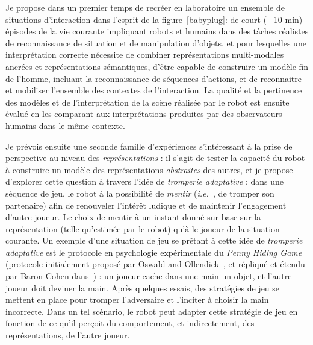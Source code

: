 \documentclass[a4paper]{article}
\newcommand{\ie}{{\textit{i.e.~}}}
\begin{document}
Je propose dans un premier temps de recréer en laboratoire un ensemble de
situations d'interaction dans l'esprit de la figure~\ref{babyplug}: de court
(~ 10 min) épisodes
de la vie courante impliquant robots et humains dans des tâches réalistes de
reconnaissance de situation et de manipulation d'objets, et pour lesquelles une
interprétation correcte nécessite de combiner représentations multi-modales
ancrées et représentations sémantiques, d'être capable de construire un modèle
fin de l'homme, incluant la reconnaissance de séquences d'actions, et de
reconnaitre et mobiliser l'ensemble des contextes de l'interaction. La qualité
et la pertinence des modèles et de l'interprétation de la scène réalisée par le
robot est ensuite évalué en les comparant aux interprétations produites par des
observateurs humains dans le même contexte.

Je prévois ensuite une seconde famille d'expériences s'intéressant à la prise de
perspective au niveau des \emph{représentations} : il s'agit de tester la
capacité du robot à construire un modèle des représentations \emph{abstraites}
des autres, et je propose d'explorer cette question à travers l'idée de
\emph{tromperie adaptative} : dans une séquence de jeu, le robot à la
possibilité de \emph{mentir} (\ie, de tromper son partenaire) afin de renouveler
l'intérêt ludique et de maintenir l'engagement d'autre joueur. Le choix de
mentir à un instant donné sur base sur la représentation (telle qu'estimée par
le robot) qu'à le joueur de la situation courante. Un exemple d'une situation
de jeu se prêtant à cette idée de \emph{tromperie adaptative} est le protocole
en psychologie expérimentale du \emph{Penny Hiding Game} (protocole initialement
proposé par Oswald and Ollendick~\cite{oswald1989role}, et répliqué et étendu
par Baron-Cohen dans~\cite{baron1992out}) : un joueur cache dans une main un
objet, et l'autre joueur doit deviner la main. Après quelques essais, des
stratégies de jeu se mettent en place pour tromper l'adversaire et l'inciter à
choisir la main incorrecte. Dans un tel scénario, le robot peut adapter cette
stratégie de jeu en fonction de ce qu'il perçoit du comportement, et
indirectement, des représentations, de l'autre joueur.
\end{document}
